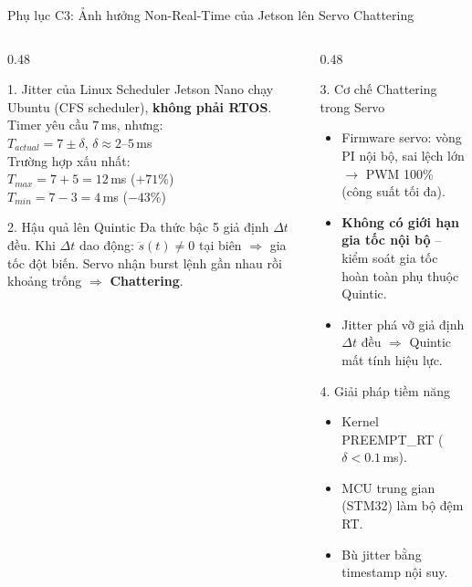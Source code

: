 \documentclass[10pt,aspectratio=169]{beamer}
\begin{document}
\begin{frame}{Phụ lục C3: Ảnh hưởng Non-Real-Time của Jetson lên Servo Chattering}
  \small
  \begin{columns}[t]
      \begin{column}{0.48\textwidth}
          \begin{block}{1. Jitter của Linux Scheduler}
              {\footnotesize Jetson Nano chạy Ubuntu (CFS scheduler), \textbf{không phải RTOS}. Timer yêu cầu $7\,$ms, nhưng:\\
              $T_{actual} = 7 \pm \delta$, \quad $\delta \approx 2\text{--}5\,$ms\\
              Trường hợp xấu nhất:\\
              $T_{max} = 7 + 5 = 12\,$ms ($+71\%$)\\
              $T_{min} = 7 - 3 = 4\,$ms ($-43\%$)}
          \end{block}
          \begin{alertblock}{2. Hậu quả lên Quintic}
              {\footnotesize Đa thức bậc 5 giả định $\Delta t$ đều. Khi $\Delta t$ dao động: $\ddot{s}(t) \neq 0$ tại biên $\Rightarrow$ gia tốc đột biến. Servo nhận burst lệnh gần nhau rồi khoảng trống $\Rightarrow$ \textbf{Chattering}.}
          \end{alertblock}
      \end{column}
      \begin{column}{0.48\textwidth}
          \begin{block}{3. Cơ chế Chattering trong Servo}
              {\footnotesize
              \begin{itemize}
                  \item Firmware servo: vòng PI nội bộ, sai lệch lớn $\rightarrow$ PWM 100\% (công suất tối đa).
                  \item \textbf{Không có giới hạn gia tốc nội bộ} -- kiểm soát gia tốc hoàn toàn phụ thuộc Quintic.
                  \item Jitter phá vỡ giả định $\Delta t$ đều $\Rightarrow$ Quintic mất tính hiệu lực.
              \end{itemize}}
          \end{block}
          \begin{block}{4. Giải pháp tiềm năng}
              {\footnotesize
              \begin{itemize}
                  \item Kernel PREEMPT\_RT ($\delta < 0.1\,$ms).
                  \item MCU trung gian (STM32) làm bộ đệm RT.
                  \item Bù jitter bằng timestamp nội suy.
              \end{itemize}}
          \end{block}
      \end{column}
  \end{columns}
\end{frame}
\end{document}

